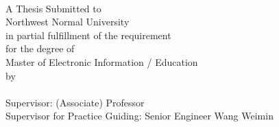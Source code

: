 {\begin{titlepage}
\begin{center}
\qquad\\
\vspace*{2.1cm}
 \begin{spacing}{1.5}
 \er\@etitle

 \end{spacing}

 \begin{spacing}{2.0}
 \vspace*{1.85\baselineskip}
 \sihao
A Thesis Submitted to\\
Northwest Normal University\\
in partial fulfillment of the requirement\\
for the degree of\\
Master of Electronic Information / Education\\
by\\
 \@ename \\
 Supervisor: (Associate) Professor \@esupervisor\\
 Supervisor for Practice Guiding: Senior Engineer Wang Weimin

\vspace*{3\baselineskip}
\sanhao\@edate


\end{spacing}
\end{center}


\end{titlepage}

  \clearpage
  \thispagestyle{empty}
  \begin{center}\hei\xiaoer{\@gongjuren}\end{center}\par
  \vspace{2.8\baselineskip}

    \begin{center}\hei\xiaoer{\@authorizationtitle}\end{center}\par
    \vspace{1.8\baselineskip}

    {
    \linespread{2.0}
    \song\sihao{\@authorizationcontent}\par

}}
